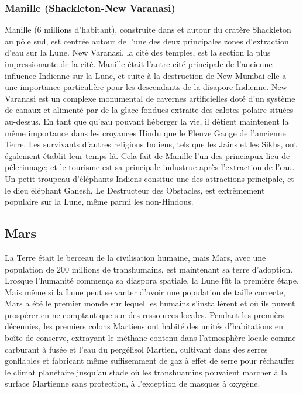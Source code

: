 \subsubsection{Manille (Shackleton-New Varanasi)} \label{sec:shackle-shackl-new} 

Manille (6 millions d'habitant), construite dans et autour du cratère Shackleton au pôle sud, est centrée autour de l'une des deux principales zones d'extraction d'eau sur la Lune. New Varanasi, la cité des temples, est la section la plus impressionante de la cité. Manille était l'autre cité principale de l'ancienne influence Indienne sur la Lune, et suite à la destruction de New Mumbai elle a une importance particulière pour les descendants de la disapore Indienne. New Varanasi est un complexe monumental de cavernes artificielles doté d'un système de canaux et alimenté par de la glace fondues extraite des calotes polaire situées au-dessus. En tant que qu'eau pouvant héberger la vie, il détient maintenent la même importance dans les croyances Hindu que le Fleuve Gange de l'ancienne Terre. Les survivants d'autres religions Indiens, tels que les Jains et les Sikhs, ont également établit leur temps là. Cela fait de Manille l'un des princiapux lieu de pélerinnage; et le tourisme est sa principale industrue après l'extraction de l'eau. Un petit troupeau d'éléphants Indiens consitue une des attractions principale, et le dieu éléphant Ganesh, Le Destructeur des Obstacles, est extrêmement populaire sur la Lune, même parmi les non-Hindous. 

\subsection{Mars} \label{sec:mars} 

La Terre était le berceau de la civilisation humaine, mais Mars, avec une population de 200 millions de transhumains, est maintenant sa terre d'adoption. Lrosque l'humanité commença sa diaspora spatiale, la Lune fût la première étape. Mais même si la Lune peut se vanter d'avoir une population de taille correcte, Mars a été le premier monde sur lequel les humains s'installèrent et où ils purent prospérer en ne comptant que sur des ressources locales. Pendant les premièrs décennies, les premiers colons Martiens ont habité des unités d'habitations en boîte de conserve, extrayant le méthane contenu dans l'atmosphère locale comme carburant à fusée et l'eau du pergélisol Martien, cultivant dans des serres gonflables et fabricant même suffisemment de gaz à effet de serre pour réchauffer le climat planétaire jusqu'au stade où les transhuamins pouvaient marcher à la surface Martienne sans protection, à l'exception de masques à oxygène. 

